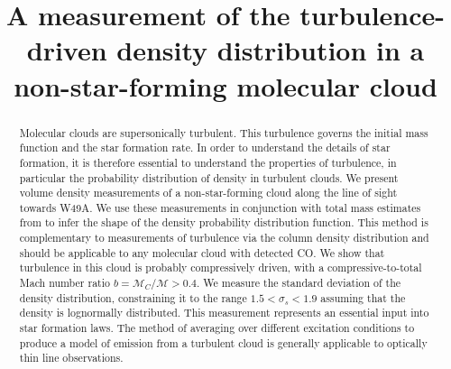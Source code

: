 \title{
A measurement of the turbulence-driven density distribution in a
non-star-forming molecular cloud
}
\begin{abstract}
    Molecular clouds are supersonically turbulent.  This turbulence governs
    the initial mass function and the star formation rate.  In order to
    understand the details of star formation, it is therefore essential to understand
    the properties of turbulence, in particular the probability distribution of
    density in turbulent clouds.
    We present \formaldehyde volume density measurements of a non-star-forming
    cloud along the line of sight towards W49A. We use these measurements in
    conjunction with total mass estimates from \thirteenco to infer the shape of the
    density probability distribution function.  This method is complementary to
    measurements of turbulence via the column density distribution and should
    be applicable to any molecular cloud with detected CO.  We show that
    turbulence in this cloud is probably compressively driven, with a
    compressive-to-total Mach number ratio $b = \mathcal{M}_C/\mathcal{M}>0.4$.  
    We measure the standard deviation of the density distribution, 
    constraining it to the range $1.5 < \sigma_s < 1.9$
    assuming that the density is lognormally distributed.  This measurement
    represents an essential input into star formation laws.
    The method of averaging over different excitation conditions to produce a 
    model of emission from a turbulent cloud is generally applicable to optically
    thin line observations.



\end{abstract}
